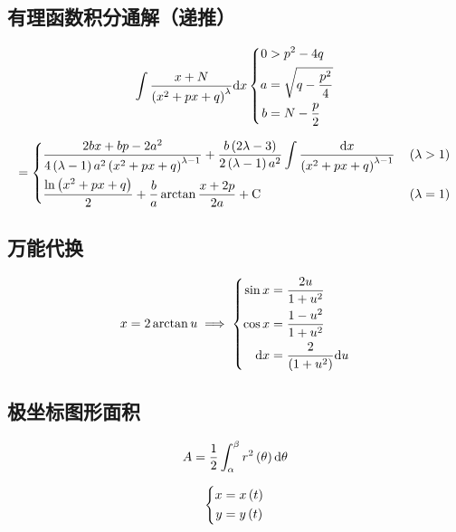 \documentclass{article}
\begin{document}
\subsection{有理函数积分通解（递推）}

\[\int{\frac{x+N}{\left(x^2+px+q\right)^\lambda}\mathrm dx}
    \left\{\begin{aligned}
        0 & >p^2-4q               \\
        a & =\sqrt{q-\frac{p^2}4} \\
        b & =N-\frac p2
    \end{aligned}\right.\]

\[=\left\{\begin{aligned}
         & \frac{2bx+bp-2a^2}{4\left(\lambda-1\right)a^2\left(x^2+px+q\right)^{\lambda-1}}+\frac{b\left(2\lambda-3\right)}{2\left(\lambda-1\right)a^2}\int\frac{\mathrm d x}{\left(x^2+px+q\right)^{\lambda-1}} &  &
        \left(\lambda>1\right)                                                                                                                                            \\
         & \frac{\ln\left(x^2+px+q\right)}2+\frac ba\arctan{\frac{x+2p}{2a}}+\mathrm C                                                                                      &  &
        \left(\lambda=1\right)                                                                                                                                            \\
    \end{aligned}\right.\]

\subsection{万能代换}

\[x=2\arctan u\implies
    \left\{\begin{aligned}
        \sin x & =\frac{2u}{1+u^2}      \\
        \cos x & =\frac{1-u^2}{1+u^2}   \\
        \mathrm d x   & =\frac2{\left(1+u^2\right)}\mathrm d u
    \end{aligned}\right.\]

\subsection{极坐标图形面积}

\[A=\frac12\int_{\alpha}^{\beta}{r^2\left(\theta\right)\mathrm d\theta}\]

\begin{definition}[以下参数方程中都有]
    \[\left\{\begin{aligned}
            x & =x\left(t\right) \\
            y & =y\left(t\right)
        \end{aligned}\right.\]
\end{definition}
\end{document}
